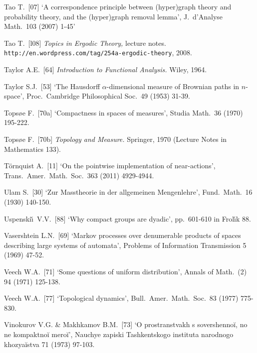 {Tao T.\ [07] `A correspondence principle between (hyper)graph theory and
probability theory, and the (hyper)graph removal lemma',
J.\ d'Analyse Math.\ 103 (2007) 1-45'
\cmmnt{[459I, \S497.]}

Tao T.\ [l08] {\it Topics in Ergodic Theory,} lecture notes.
{\tt http://en.wordpress.com/tag/254a-ergodic-theory}, 2008.
\cmmnt{[494F.]}

Taylor A.E.\ [64] {\it Introduction to Functional Analysis.}  Wiley,
1964.
\cmmnt{[\S4A4.]}

Taylor S.J.\ [53] `The Hausdorff $\alpha$-dimensional measure of Brownian
paths in $n$-space',
Proc.\ Cambridge Philosophical Soc.\ 49 (1953) 31-39.
\cmmnt{[477L.]}

Tops{\o}e F.\ [70a] `Compactness in spaces of measures', Studia Math.\ 36
(1970) 195-222.
\cmmnt{[413I, 416K.]}

Tops{\o}e F.\ [70b] {\it Topology and Measure.}  Springer, 1970 (Lecture
Notes in Mathematics 133).
\cmmnt{[437J.]}

T\"ornquist A.\ [11] `On the pointwise implementation of near-actions',
Trans.\ Amer.\ Math.\ Soc.\ 363 (2011) 4929-4944.
\cmmnt{[425D, 425Ya.]}

\medskip%

Ulam S.\ [30] `Zur Masstheorie in der allgemeinen
Mengenlehre', Fund.\ Math.\ 16 (1930) 140-150.
\cmmnt{[419G, 438C.]}

Uspenski\v\i\ V.V.\ [88] `Why compact groups are dyadic', pp.\ 601-610
in {\smc Frol\'\i k 88}.
\cmmnt{[4A5T.]}

\medskip%

Vasershtein L.N.\ [69] `Markov processes over denumerable products of
spaces describing large systems of automata', Problems of Information
Transmission 5 (1969) 47-52.
\cmmnt{[457L.]}

Veech W.A.\ [71] `Some questions of uniform distribution', Annals of Math.\ (2) 94 (1971) 125-138.
\cmmnt{[491H.]}

Veech W.A.\ [77] `Topological dynamics', Bull.\ Amer.\ Math.\ Soc.\ 83 (1977) 775-830.
\cmmnt{[493H.]}

{\cyr Vinokurov V.G.} \& {\cyr Ma{kh}kamov B.M.\ [73] `O prostranstva{kh}
s sover{sh}enno\u{i}, no ne kompaktno\u{i} mero\u{i}',
Nau{ch}ye zapiski Ta{sh}ken{t}skogo instituta narodnogo
{kh}oz{ya}\u{i}stva 71 (1973) 97-103.}
\cmmnt{[451U.]}

}
